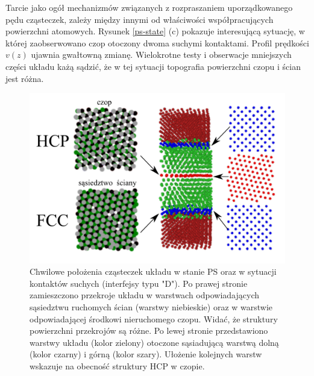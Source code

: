 \documentclass[12pt,a4paper,openright]{report} %
\begin{document}
Tarcie jako ogół mechanizmów związanych z rozpraszaniem uporządkowanego pędu cząsteczek, zależy między innymi od właściwości współpracujących powierzchni atomowych. Rysunek \ref{ps-state} (c) pokazuje interesującą sytuację, w której zaobserwowano czop otoczony dwoma suchymi kontaktami. Profil prędkości $v(z)$ ujawnia gwałtowną zmianę. Wielokrotne testy i obserwacje mniejszych części układu każą sądzić, że w tej sytuacji topografia powierzchni czopu i ścian jest różna. 
%
\begin{figure}[h]
\centering
\includegraphics[width=160mm]{rysunki/PS-orientacja-czopu.pdf}
\caption{Chwilowe położenia cząsteczek układu w stanie PS oraz w sytuacji kontaktów suchych (interfejsy typu "D"). Po prawej stronie zamieszczono przekroje układu w warstwach odpowiadających sąsiedztwu ruchomych ścian (warstwy niebieskie) oraz w warstwie odpowiadającej środkowi nieruchomego czopu. Widać, że struktury powierzchni przekrojów są różne. Po lewej stronie przedstawiono warstwy układu (kolor zielony) otoczone sąsiadującą warstwą dolną (kolor czarny) i górną (kolor szary). Ułożenie kolejnych warstw wskazuje na obecność struktury HCP w czopie.}
\label{PS-orientacja-czopu}
\end{figure}
\end{document}
